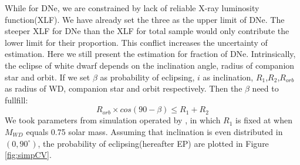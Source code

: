 \documentclass[fleqn,usenatbib]{mnras}
\begin{document}
While for DNe, we are constrained by lack of reliable X-ray luminosity function(XLF). We have already set the three as the upper limit of DNe. The steeper XLF for DNe than the XLF for total sample would only contribute the lower limit for their proportion. This conflict increases the  uncertainty of estimation. Here we still present the estimation for fraction of DNe.
Intrinsically, the eclipse of white dwarf depends on the inclination angle, radius of companion star and orbit. If we set $\beta$ as probability of eclipsing, $i$ as inclination, $R_1$,$R_2$,$R_{orb}$ as radius of WD, companion star and orbit respectively. Then the $\beta$ need to fullfill:
\begin{equation}
{R_{orb}\times cos(90-\beta)}\leq { R_1+R_2}
\end{equation}
We took parameters from simulation operated by \citep{2011ApJS..194...28K}, in which $R_1$ is fixed at when $M_{WD}$ equals 0.75 solar mass. Assuming that inclination is even distributed in $(0,90^\circ)$, the probability of eclipsing(hereafter EP) are plotted in Figure \ref{fig:simpCV}.
\end{document}
